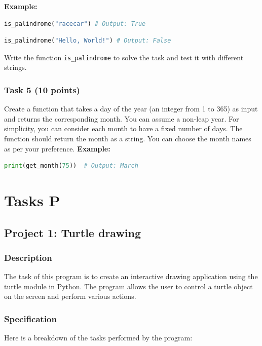 \documentclass[12pt]{article}
\begin{document}
\textbf{Example:}
\begin{lstlisting}[language=Python]
is_palindrome("racecar") # Output: True
\end{lstlisting}


\begin{lstlisting}[language=Python]
is_palindrome("Hello, World!") # Output: False
\end{lstlisting}


Write the function \texttt{is\_palindrome} to solve the task and test it with different strings.



\subsubsection{Task 5 (10 points)}
Create a function that takes a day of the year (an integer from 1 to 365) as input and returns the corresponding month. You can assume a non-leap year. For simplicity, you can consider each month to have a fixed number of days. The function should return the month as a string. You can choose the month names as per your preference.
\textbf{Example:}
\begin{lstlisting}[language=Python]
print(get_month(75))  # Output: March
\end{lstlisting}


\section{Tasks P}
\subsection{Project 1: Turtle drawing }
\subsubsection{Description}

The task of this program is to create an interactive drawing application using the turtle module in Python. The program allows the user to control a turtle object on the screen and perform various actions. 

\subsubsection{Specification}
Here is a breakdown of the tasks performed by the program:
\end{document}
